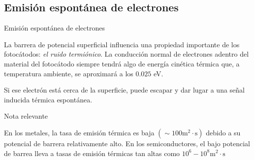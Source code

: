 \documentclass[a4paper,10pt]{beamer}
\begin{document}
\subsection{Emisión espontánea de electrones}
\begin{frame}{Emisión espontánea de electrones}
 \begin{justify}
 La barrera de potencial superficial influencia una propiedad importante de los
 fotocátodos: \emph{el ruido termiónico}. La conducción normal de electrones
 adentro del material del fotocátodo siempre tendrá algo de energía cinética térmica
 que, a temperatura ambiente, se aproximará a los $0.025$ eV. 
 
 \vspace{.3cm}
 
 Si ese electrón está cerca de la superficie, puede escapar y dar lugar a una señal
 inducida térmica espontánea.
  
\begin{block}{Nota relevante}
 \begin{justify}
  En los metales, la tasa de emisión térmica es baja $(\sim 100 \text{m}^2\cdot \text{s})$
  debido a su potencial de barrera relativamente alto. En los semiconductores, el bajo 
  potencial de barrea lleva a tasas de emisión térmicas tan altas como $10^6-10^8 \text{m}^2\cdot \text{s}$
 \end{justify}
 \end{block}
\end{justify}
\end{frame}
\end{document}
